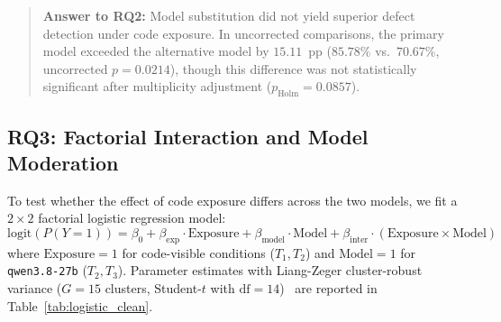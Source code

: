 \documentclass[11pt,a4paper]{article}
\begin{document}
\begin{quote}
\textbf{Answer to RQ2:} Model substitution did not yield superior defect detection under code exposure. In uncorrected comparisons, the primary model exceeded the alternative model by $15.11$~pp ($85.78\%$ vs.\ $70.67\%$, uncorrected $p = 0.0214$), though this difference was not statistically significant after multiplicity adjustment ($p_{\text{Holm}} = 0.0857$).
\end{quote}

\begin{table}[t]
\centering
\caption{Task-Level Paired Comparisons Across Matched Task Clusters under AST-Scoped Clean Harness ($N=15$ Task Clusters, $\text{df}=14$).}
\label{tab:paired_clean}
\end{table}

\subsection{RQ3: Factorial Interaction and Model Moderation}
To test whether the effect of code exposure differs across the two models, we fit a $2 \times 2$ factorial logistic regression model:
\begin{equation}
    \text{logit}(P(Y=1)) = \beta_0 + \beta_{\text{exp}} \cdot \text{Exposure} + \beta_{\text{model}} \cdot \text{Model} + \beta_{\text{inter}} \cdot (\text{Exposure} \times \text{Model})
\end{equation}
where $\text{Exposure} = 1$ for code-visible conditions ($T_1, T_2$) and $\text{Model} = 1$ for \texttt{qwen3.8-27b} ($T_2, T_3$). Parameter estimates with Liang-Zeger cluster-robust variance ($G=15$ clusters, Student-$t$ with $\text{df}=14$)~\cite{liang1986longitudinal} are reported in Table~\ref{tab:logistic_clean}.
\end{document}
